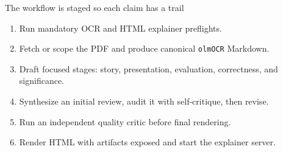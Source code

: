 \documentclass[aspectratio=169,professionalfonts]{beamer}
\begin{document}
\begin{frame}{The workflow is staged so each claim has a trail}
  \begin{enumerate}
    \item Run mandatory OCR and HTML explainer preflights.
    \item Fetch or scope the PDF and produce canonical \texttt{olmOCR} Markdown.
    \item Draft focused stages: story, presentation, evaluation, correctness,
      and significance.
    \item Synthesize an initial review, audit it with self-critique, then revise.
    \item Run an independent quality critic before final rendering.
    \item Render HTML with artifacts exposed and start the explainer server.
  \end{enumerate}

\end{frame}
\end{document}
